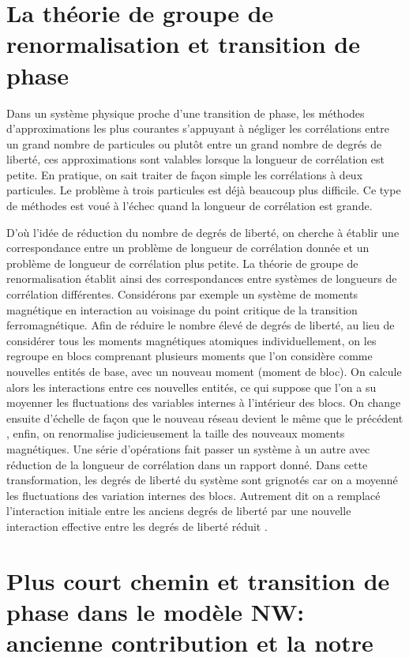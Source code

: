 \begin{sloppypar}
\section{La théorie de groupe de renormalisation et transition de phase}
\end{sloppypar}
Dans un système physique proche d'une transition de phase, les méthodes d'approximations les plus courantes s'appuyant à négliger les corrélations entre un grand nombre de particules ou plutôt entre un grand nombre de degrés de liberté, ces approximations sont valables lorsque la longueur de corrélation est petite. En pratique, on sait traiter de façon simple les corrélations à deux particules. Le problème à trois particules est déjà beaucoup plus difficile. Ce type de méthodes est voué à l'échec quand la longueur de corrélation est grande.

D'où l'idée de réduction du nombre de degrés de liberté, on cherche à établir une correspondance entre un problème de longueur de corrélation donnée et un problème de longueur de corrélation plus petite. La théorie de groupe de renormalisation établit ainsi des correspondances entre systèmes de longueurs de corrélation différentes. Considérons par exemple un système de moments magnétique en interaction au voisinage du point critique de la transition ferromagnétique. Afin de réduire le nombre élevé de degrés de liberté, au lieu de considérer tous les moments magnétiques atomiques individuellement, on les regroupe en blocs comprenant plusieurs moments que l'on considère comme nouvelles entités de base, avec un nouveau moment (moment de bloc). On calcule alors les interactions entre ces nouvelles entités, ce qui suppose que l'on a su moyenner les fluctuations des variables internes à l'intérieur des blocs. On change ensuite d'échelle de façon que le nouveau réseau devient le même que le précédent , enfin, on renormalise judicieusement la taille des nouveaux moments magnétiques. Une série d'opérations fait passer un système à un autre avec réduction de la longueur de corrélation dans un rapport donné. Dans cette transformation, les degrés de liberté du système sont grignotés car on a moyenné les fluctuations des variation internes des blocs. Autrement dit on a remplacé l'interaction initiale entre les anciens degrés de liberté par une nouvelle interaction effective entre les degrés de liberté réduit \cite{Pelissetto-Vicari2002,Wilson1975}.

\section{Plus court chemin et transition de phase dans le modèle NW: ancienne contribution et la notre}
